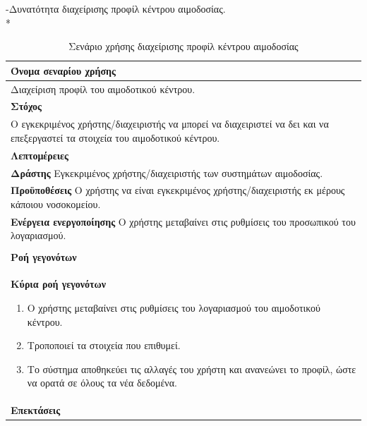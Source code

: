 -Δυνατότητα διαχείρισης προφίλ κέντρου αιμοδοσίας.
\\*

\begin{table}[H]
	\begin{center}
	    \begin{tabular}{|p{\dimexpr \linewidth-2\tabcolsep}|}
	    \hline
	    \rowcolor{grayy}
	    \textbf{Όνομα σεναρίου χρήσης}
	    \\ \hline    
	    Διαχείριση προφίλ του αιμοδοτικού κέντρου. 
	     \\ \hline
	    \rowcolor{grayy}
	    \textbf{\textbf{Στόχος}}
	    \\ \hline
	 	 Ο εγκεκριμένος χρήστης/διαχειριστής να μπορεί να διαχειριστεί να δει και να επεξεργαστεί τα στοιχεία του αιμοδοτικού κέντρου.
	    \\ \hline
	    \rowcolor{grayy}
	    \textbf{Λεπτομέρειες}
	    \\ \hline
		\textbf{Δράστης} Εγκεκριμένος χρήστης/διαχειριστής των συστημάτων αιμοδοσίας.
		\\*
		\textbf{Προϋποθέσεις} Ο χρήστης να είναι εγκεκριμένος χρήστης/διαχειριστής εκ μέρους κάποιου νοσοκομείου.
		\\*
		\textbf{Ενέργεια ενεργοποίησης} Ο χρήστης μεταβαίνει στις ρυθμίσεις του προσωπικού του λογαριασμού.
		\\ \hline
	    \\ \hline
		\rowcolor{grayy}    
	    \textbf{Ροή γεγονότων}
	    \\* 
		\textbf{Κύρια ροή γεγονότων}
		\begin{enumerate}
			\item	 Ο χρήστης μεταβαίνει στις ρυθμίσεις του λογαριασμού του αιμοδοτικού κέντρου.
			\item Τροποποιεί τα στοιχεία που επιθυμεί.
			\item Το σύστημα αποθηκεύει τις αλλαγές του χρήστη και ανανεώνει το προφίλ, ώστε να ορατά σε όλους τα νέα δεδομένα.
		\end{enumerate}
		\\*
		\textbf{Επεκτάσεις}
		   \\ \hline
	    \end{tabular}
	    \caption{Σενάριο χρήσης διαχείρισης προφίλ κέντρου αιμοδοσίας}
	    \label{tab:blood_center_account_management}
	\end{center}
\end{table}	

	


